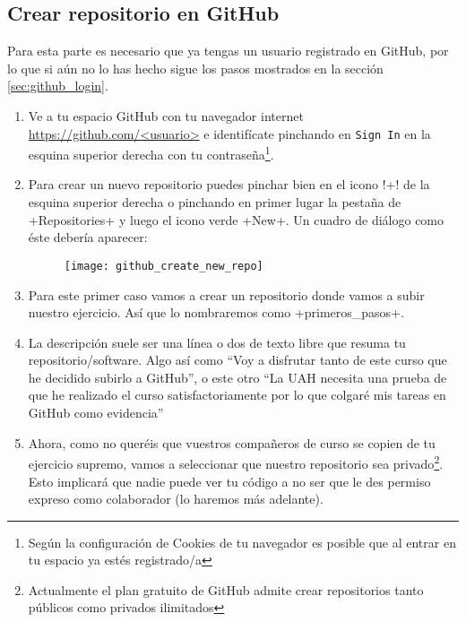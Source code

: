 \documentclass[a5paper,10pt]{article}
\begin{document}
    \subsection{Crear repositorio en GitHub}
      Para esta parte es necesario que ya tengas un usuario registrado en GitHub, por lo que si  aún no lo has hecho sigue los pasos mostrados en la sección \ref{sec:github_login}.
      
      \begin{enumerate}
       \item Ve a tu espacio GitHub con tu navegador internet \url{https://github.com/<usuario>} e identifícate pinchando en \verb+Sign In+ en la esquina superior derecha con tu contraseña\footnote{Según la configuración de Cookies de tu navegador es posible que al entrar en tu espacio ya estés registrado/a}.
       \item Para crear un nuevo repositorio puedes pinchar bien en el icono \cverb!+! de la esquina superior derecha o pinchando en primer lugar la pestaña de \cverb+Repositories+ y luego el icono verde \cverb+New+. Un cuadro de diálogo como éste debería aparecer:
       
       \begin{figure}[H]\centering
        \hspace{-1cm}\texttt{[image: github\_create\_new\_repo]}
       \end{figure}
       
       \item Para este primer caso vamos a crear un repositorio donde vamos a subir nuestro ejercicio. Así que lo nombraremos como \cverb+primeros_pasos+.
       
       \item La descripción suele ser una línea o dos de texto libre que resuma tu repositorio/software. Algo así como ``Voy a disfrutar tanto de este curso que he decidido subirlo a GitHub'', o este otro ``La UAH necesita una prueba de que he realizado el curso satisfactoriamente por lo que colgaré mis tareas en GitHub como evidencia''
       
       \item Ahora, como no queréis que vuestros compañeros de curso se copien de tu ejercicio supremo, vamos a seleccionar que nuestro repositorio sea privado\footnote{Actualmente el plan gratuito de GitHub admite crear repositorios tanto públicos como privados ilimitados}. Esto implicará que nadie puede ver tu código a no ser que le des permiso expreso como colaborador (lo haremos más adelante).
       

\end{enumerate}
\end{document}
